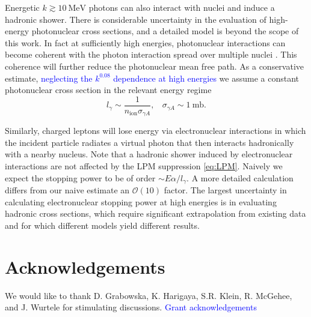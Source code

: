 \documentclass[twocolumn,showpacs,preprintnumbers,amsmath,amssymb,prd]{revtex4}
\newcommand{\OO}{\mathcal{O}}
\begin{document}
\begin{appendices}
Energetic $k \gtrsim 10 ~\text{MeV}$ photons can also interact with nuclei and induce a hadronic shower. There is considerable uncertainty in the evaluation of high-energy photonuclear cross sections, and a detailed model is beyond the scope of this work. In fact at sufficiently high energies, photonuclear interactions can become coherent with the photon interaction spread over multiple nuclei \cite{Gerhardt:2010bj}. This coherence will further reduce the photonuclear mean free path. As a conservative estimate, \textcolor{blue}{neglecting the $k^{0.08}$ dependence at high energies} we assume a constant photonuclear cross section in the relevant energy regime
\begin{equation}
l_\gamma \sim \frac{1}{n_\text{ion} \sigma_{\gamma A}}, ~~~~ \sigma_{\gamma A} \sim 1 ~\text{mb}.
\end{equation}

Similarly, charged leptons will lose energy via electronuclear interactions in which the incident particle radiates a virtual photon that then interacts hadronically with a nearby nucleus. Note that a hadronic shower induced by electronuclear interactions are not affected by the LPM suppression \eqref{eq:LPM}. Naively we expect the stopping power to be of order $\sim E \alpha/l_\gamma$. A more detailed calculation \cite{Gerhardt:2010bj} differs from our naive estimate an $\OO(10)$ factor. The largest uncertainty in calculating electronuclear stopping power at high energies is in evaluating hadronic cross sections, which require significant extrapolation from existing data and for which different models yield different results.

\end{appendices}

\section*{Acknowledgements}
We would like to thank D. Grabowska, K. Harigaya, S.R. Klein, R. McGehee, and J. Wurtele for stimulating discussions. \textcolor{blue}{Grant acknowledgements}


\end{document}

